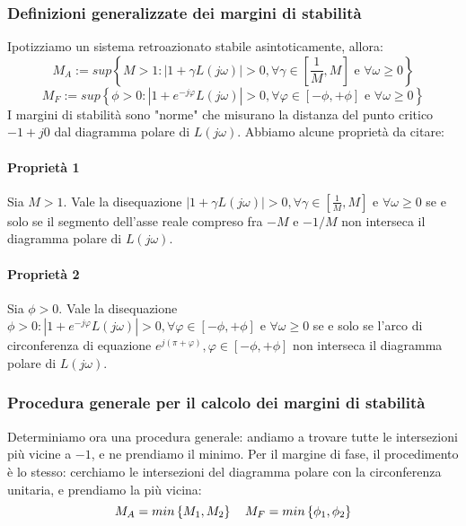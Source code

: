 \documentclass[11pt]{article}
\begin{document}
\subsubsection{Definizioni generalizzate dei margini di stabilità}
Ipotizziamo un sistema retroazionato stabile asintoticamente, allora:
\begin{displaymath}
    M_A := sup \left\{M>1: |1+\gamma L(j\omega)|>0, \forall \gamma \in \left[\frac{1}{M},M\right] \textrm{ e }\forall\omega\ge0\right\}
\end{displaymath}
\begin{displaymath}
    M_F := sup\left\{\phi>0: |1+e^{-j\varphi}L(j\omega)|>0, \forall \varphi \in \left[-\phi,+\phi\right] \textrm{ e }\forall\omega\ge0\right\}
\end{displaymath}
I margini di stabilità sono "norme" che misurano la distanza del punto critico $-1+j0$ dal diagramma polare di $L(j\omega)$.
Abbiamo alcune proprietà da citare:
\paragraph{Proprietà 1} Sia $M>1$. Vale la disequazione $|1+\gamma L(j\omega)|>0, \forall \gamma \in \left[\frac{1}{M},M\right] \textrm{ e }\forall\omega\ge0$ se e solo se il segmento dell'asse reale compreso fra $-M$ e $-1/M$ non interseca il diagramma polare di $L(j\omega)$.
\paragraph{Proprietà 2} Sia $\phi>0$. Vale la disequazione $\phi>0: |1+e^{-j\varphi}L(j\omega)|>0, \forall \varphi \in \left[-\phi,+\phi\right] \textrm{ e }\forall\omega\ge0$ se e solo se l'arco di circonferenza di equazione $e^{j(\pi+\varphi)}, \varphi \in \left[-\phi, +\phi\right]$ non interseca il diagramma polare di $L(j\omega)$.
\subsubsection{Procedura generale per il calcolo dei margini di stabilità}
Determiniamo ora una procedura generale: andiamo a trovare tutte le intersezioni più vicine a $-1$, e ne prendiamo il minimo. Per il margine di fase, il procedimento è lo stesso: cerchiamo le intersezioni del diagramma polare con la circonferenza unitaria, e prendiamo la più vicina:
\begin{displaymath}
    M_A = min\left\{M_1,M_2\right\}\hspace{10px}M_F = min\left\{\phi_1,\phi_2\right\}
\end{displaymath}
\end{document}
